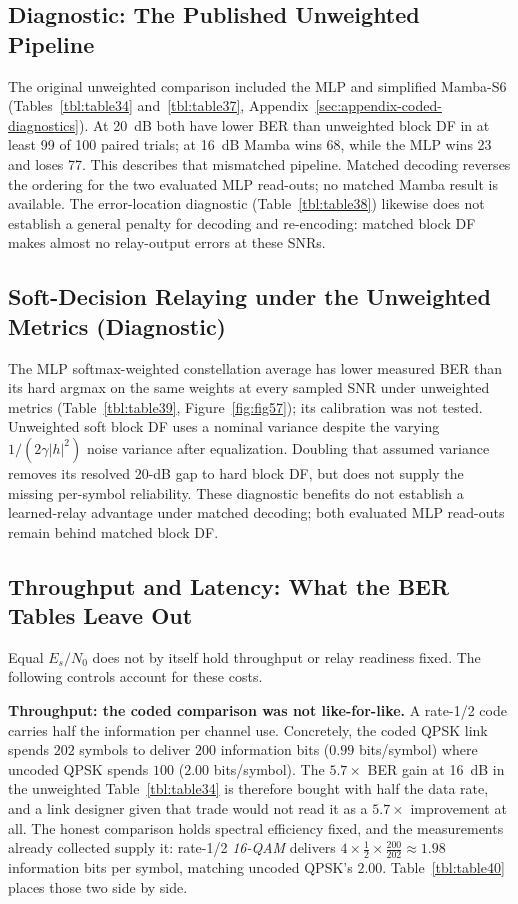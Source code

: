 \subsection{Diagnostic: The Published Unweighted Pipeline}\label{sec:coded-unweighted}

The original unweighted comparison included the MLP and simplified Mamba-S6 (Tables~\ref{tbl:table34} and~\ref{tbl:table37}, Appendix~\ref{sec:appendix-coded-diagnostics}). At 20~dB both have lower BER than unweighted block DF in at least 99 of 100 paired trials; at 16~dB Mamba wins 68, while the MLP wins 23 and loses 77. This describes that mismatched pipeline. Matched decoding reverses the ordering for the two evaluated MLP read-outs; no matched Mamba result is available. The error-location diagnostic (Table~\ref{tbl:table38}) likewise does not establish a general penalty for decoding and re-encoding: matched block DF makes almost no relay-output errors at these SNRs.

\subsection{Soft-Decision Relaying under the Unweighted Metrics (Diagnostic)}\label{sec:coded-soft-decision}

The MLP softmax-weighted constellation average has lower measured BER than its hard argmax on the same weights at every sampled SNR under unweighted metrics (Table~\ref{tbl:table39}, Figure~\ref{fig:fig57}); its calibration was not tested. Unweighted soft block DF uses a nominal variance despite the varying $1/(2\gamma|h|^2)$ noise variance after equalization. Doubling that assumed variance removes its resolved 20-dB gap to hard block DF, but does not supply the missing per-symbol reliability. These diagnostic benefits do not establish a learned-relay advantage under matched decoding; both evaluated MLP read-outs remain behind matched block DF.

\subsection{Throughput and Latency: What the BER Tables Leave Out}\label{sec:coded-latency-throughput}

Equal $E_s/N_0$ does not by itself hold throughput or relay readiness fixed. The following controls account for these costs.

\textbf{Throughput: the coded comparison was not like-for-like.} A rate-1/2 code carries half the information per channel use. Concretely, the coded QPSK link spends $202$ symbols to deliver $200$ information bits ($0.99$ bits/symbol) where uncoded QPSK spends $100$ ($2.00$ bits/symbol). The $5.7\times$ BER gain at 16~dB in the unweighted Table~\ref{tbl:table34} is therefore bought with half the data rate, and a link designer given that trade would not read it as a $5.7\times$ improvement at all. The honest comparison holds spectral efficiency fixed, and the measurements already collected supply it: rate-1/2 \emph{16-QAM} delivers $4 \times \tfrac12 \times \tfrac{200}{202} \approx 1.98$ information bits per symbol, matching uncoded QPSK's $2.00$. Table~\ref{tbl:table40} places those two side by side.

